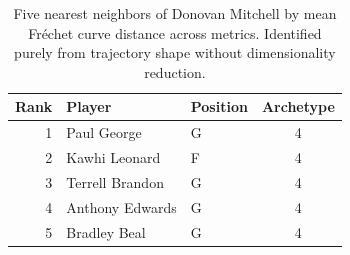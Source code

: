 \begin{table}[htbp]
  \centering\small
  \begin{tabular}{rllc}
    \toprule
    Rank & Player & Position & Archetype \\
    \midrule
    1 & Paul George & G & 4 \\
    2 & Kawhi Leonard & F & 4 \\
    3 & Terrell Brandon & G & 4 \\
    4 & Anthony Edwards & G & 4 \\
    5 & Bradley Beal & G & 4 \\
    \bottomrule
  \end{tabular}
  \caption{Five nearest neighbors of Donovan Mitchell by mean Fr\'{e}chet curve distance across metrics. Identified purely from trajectory shape without dimensionality reduction.}
  \label{tab:Donovan_Mitchell_frechet_curve_neighbors}
\end{table}

